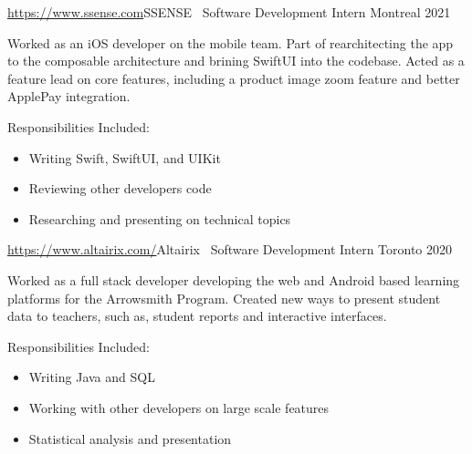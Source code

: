 \documentclass[]{style}
\begin{document}
\begin{entrylist}


\vspace{2mm}

\entry
{\url{https://www.ssense.com}{SSENSE} \ {\normalfont Software Development Intern}\vspace{1mm}}
{Montreal 2021}
{Worked as an iOS developer on the mobile team. Part of rearchitecting the app to the composable architecture and brining SwiftUI into the codebase. Acted as a feature lead on core features, including a product image zoom feature and better ApplePay integration.
~ \vspace{1mm}

Responsibilities Included:

\begin{itemize}
	\item Writing Swift, SwiftUI, and UIKit
	\item Reviewing other developers code
	\item Researching and presenting on technical topics
\end{itemize}}


\vspace{2mm}

\entry
{\url{https://www.altairix.com/}{Altairix} \ {\normalfont Software Development Intern} \vspace{1mm}}
{Toronto 2020}
{Worked as a full stack developer developing the web and Android based learning platforms for the Arrowsmith Program. Created new ways to present student data to teachers, such as, student reports and interactive interfaces.
­~ \vspace{1mm}

Responsibilities Included:

\begin{itemize}
	\item Writing Java and SQL
	\item Working with other developers on large scale features
	\item Statistical analysis and presentation
\end{itemize}}



\end{entrylist}
\end{document}
